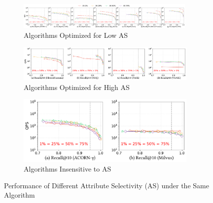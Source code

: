 \documentclass[sigconf, nonacm]{acmart}
\begin{document}
	\begin{figure}
	\centering
	
	\begin{subfigure}{\textwidth}
		\centering
		
		\includegraphics[width=0.95\textwidth]{fig/exp_5_2_1.pdf}
		\caption{Algorithms Optimized for Low AS}
		\label{fig:exp_5_2_1}
	\end{subfigure}
	
	\vfill %
	
	\begin{subfigure}{0.627\textwidth} %
		\centering
		
		\includegraphics[width=0.96\textwidth]{fig/exp_5_2_2.pdf}
		\caption{Algorithms Optimized for High AS}
		\label{fig:exp_5_2_2}
	\end{subfigure}
	\hspace{1mm} %
	\begin{subfigure}{0.33\textwidth} %
		\centering
		
		\includegraphics[width=0.96\textwidth]{fig/exp_5_2_3.pdf}
		\caption{Algorithms Insensitive to AS}
		\label{fig:exp_5_2_3}
	\end{subfigure}
	
	
	\caption{Performance of Different Attribute Selectivity (AS) under the Same Algorithm}
	\label{fig:attribute_selectivity}
\end{figure}
\end{document}
